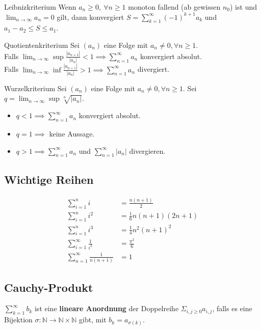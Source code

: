 \documentclass[a4paper,10pt]{article}
\def\limn{\lim_{n\to \infty}}
\def\sumk{\sum_{k=1}^\infty}
\begin{document}
\begin{subbox}{Leibnizkriterium}
Wenn $a_n \ge 0, \ \forall n \ge 1$ monoton fallend (ab gewissen $n_0$) ist und $\limn a_n = 0$ gilt, dann konvergiert $S = \sumk (-1)^{k+1} a_k$ und $a_1 - a_2 \le S \le a_1$.
\end{subbox}

\begin{mainbox}{Quotientenkriterium}
Sei $(a_n)$ eine Folge mit $a_n \ne 0, \forall n \ge 1$. \\ Falls $\limn \sup \frac{|a_{n+1}|}{|a_n|} < 1 \implies \sum_{n=1}^\infty a_n$ konvergiert absolut. \\Falls $\limn \inf \frac{|a_{n+1}|}{|a_n|} > 1 \implies \sum_{n=1}^\infty a_n$ divergiert.  
\end{mainbox}

\begin{mainbox}{Wurzelkriterium}
Sei $(a_n)$ eine Folge mit $a_n \ne 0, \forall n \ge 1$. Sei $q = \limn \sup \sqrt[n]{|a_n|}$. 
\begin{itemize}
 \item $q < 1 \implies \sum_{n=1}^\infty a_n$ konvergiert absolut.
 \item $q = 1 \implies$ keine Aussage.
 \item $q > 1 \implies \sum_{n=1}^\infty a_n$ und $\sum_{n=1}^\infty |a_n|$ divergieren.
\end{itemize}
\end{mainbox}

\subsection{Wichtige Reihen}
\begin{align*}
 \sum_{i=1}^n i &= \frac{n(n+1)}{2} \\
 \sum_{i=1}^n i^2 &= \frac{1}{6}n(n+1)(2n+1) \\
 \sum_{i=1}^n i^3 &= \frac{1}{4}n^2(n+1)^2 \\
 \sum_{i=1}^\infty \frac{1}{i^2} &= \frac{\pi^2}{6} \\
 \sum_{n=1}^\infty \frac{1}{n(n+1)} &= 1
\end{align*}

\subsection{Cauchy-Produkt}
$\sumk b_k$ ist eine \textbf{lineare Anordnung} der Doppelreihe $\Sigma_{i,j \geq 0} a_{i,j}$, falls es eine Bijektion $\sigma : \mathbb{N} \rightarrow \mathbb{N} \times \mathbb{N}$ gibt, mit $b_k = a_{\sigma(k)}$.\\
\end{document}
